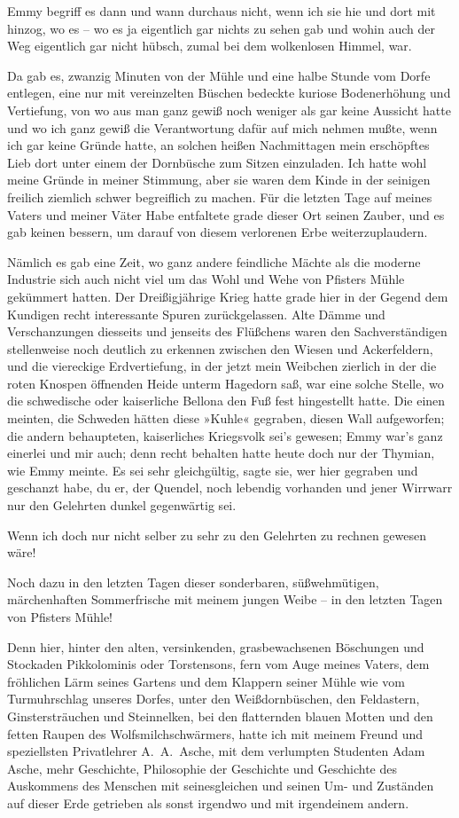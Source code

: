 Emmy begriff es dann und wann durchaus nicht, wenn ich sie hie und
dort mit hinzog, wo es – wo es ja eigentlich gar nichts zu sehen
gab und wohin auch der Weg eigentlich gar nicht hübsch, zumal bei
dem wolkenlosen Himmel, war.

Da gab es, zwanzig Minuten von der Mühle und eine halbe Stunde vom
Dorfe entlegen, eine nur mit vereinzelten Büschen bedeckte kuriose
Bodenerhöhung und Vertiefung, von wo aus man ganz gewiß noch
weniger als gar keine Aussicht hatte und wo ich ganz gewiß die
Verantwortung dafür auf mich nehmen mußte, wenn ich gar keine
Gründe hatte, an solchen heißen Nachmittagen mein erschöpftes Lieb
dort unter einem der Dornbüsche zum Sitzen einzuladen. Ich hatte
wohl meine Gründe in meiner Stimmung, aber sie waren dem Kinde in
der seinigen freilich ziemlich schwer begreiflich zu machen. Für
die letzten Tage auf meines Vaters und meiner Väter Habe entfaltete
grade dieser Ort seinen Zauber, und es gab keinen bessern, um
darauf von diesem verlorenen Erbe weiterzuplaudern.

Nämlich es gab eine Zeit, wo ganz andere feindliche Mächte als die
moderne Industrie sich auch nicht viel um das Wohl und Wehe von
Pfisters Mühle gekümmert hatten. Der Dreißigjährige Krieg hatte
grade hier in der Gegend dem Kundigen recht interessante Spuren
zurückgelassen. Alte Dämme und Verschanzungen diesseits und
jenseits des Flüßchens waren den Sachverständigen stellenweise noch
deutlich zu erkennen zwischen den Wiesen und Ackerfeldern, und die
viereckige Erdvertiefung, in der jetzt mein Weibchen zierlich in
der die roten Knospen öffnenden Heide unterm Hagedorn saß, war eine
solche Stelle, wo die schwedische oder kaiserliche Bellona den Fuß
fest hingestellt hatte. Die einen meinten, die Schweden hätten
diese »Kuhle« gegraben, diesen Wall aufgeworfen; die andern
behaupteten, kaiserliches Kriegsvolk sei's gewesen; Emmy war's ganz
einerlei und mir auch; denn recht behalten hatte heute doch nur der
Thymian, wie Emmy meinte. Es sei sehr gleichgültig, sagte sie, wer
hier gegraben und geschanzt habe, du er, der Quendel, noch lebendig
vorhanden und jener Wirrwarr nur den Gelehrten dunkel gegenwärtig
sei.

Wenn ich doch nur nicht selber zu sehr zu den Gelehrten zu rechnen
gewesen wäre!

Noch dazu in den letzten Tagen dieser sonderbaren, süßwehmütigen,
märchenhaften Sommerfrische mit meinem jungen Weibe – in den
letzten Tagen von Pfisters Mühle!

Denn hier, hinter den alten, versinkenden, grasbewachsenen
Böschungen und Stockaden Pikkolominis oder Torstensons, fern vom
Auge meines Vaters, dem fröhlichen Lärm seines Gartens und dem
Klappern seiner Mühle wie vom Turmuhrschlag unseres Dorfes, unter
den Weißdornbüschen, den Feldastern, Ginstersträuchen und
Steinnelken, bei den flatternden blauen Motten und den fetten
Raupen des Wolfsmilchschwärmers, hatte ich mit meinem Freund und
speziellsten Privatlehrer A.~A.~Asche, mit dem verlumpten Studenten
Adam Asche, mehr Geschichte, Philosophie der Geschichte und
Geschichte des Auskommens des Menschen mit seinesgleichen und
seinen Um- und Zuständen auf dieser Erde getrieben als sonst
irgendwo und mit irgendeinem andern.

